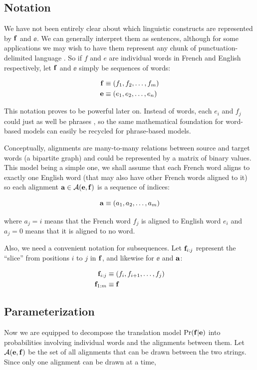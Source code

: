 \documentclass[11pt]{article}
\begin{document}
\subsection{Notation} \label{notation}
We have not been entirely clear about which linguistic constructs are represented by $\ff$ and $\ee$.
We can generally interpret them as sentences, although for some applications we may wish
to have them represent any chunk of punctuation-delimited language \cite{och:99}.
So if $f$ and $e$ are individual words in French and English respectively, let $\ff$ and $\ee$
simply be sequences of words:

\begin{align*}
    \ff &\equiv (f_1, f_2, \dotsc, f_m) \\
    \ee &\equiv (e_1, e_2, \dotsc, e_n) \\
\end{align*}

This notation proves to be powerful later on. Instead of words, each $e_i$ and $f_j$ could just as well be
phrases \cite{och:99, koehn:03}, so the same mathematical foundation for word-based models
can easily be recycled for phrase-based models.

Conceptually, alignments are many-to-many relations between source and target words (a bipartite graph) and
could be represented by a matrix of binary values. 
This model being a simple one, we shall assume that each French word aligns to exactly one English word (that may also have other French
words aligned to it) so each alignment $\aa \in \scriptA(\ee, \ff)$ is a sequence of indices:

\[
    \aa \equiv (a_1, a_2, \dotsc, a_m)
\]

where $a_j = i$ means that the French word $f_j$ is aligned to English word $e_i$ and $a_j = 0$ means that it is aligned
to no word.

Also, we need a convenient notation for subsequences.
Let $\ff_{i:j}$ represent the ``slice'' from positions $i$ to $j$ in $\ff$, and likewise for $\ee$ and $\aa$:

\begin{align*}
    \ff_{i:j} &\equiv (f_i, f_{i+1}, \dotsc, f_j) \\
    \ff_{1:m} &\equiv \ff
\end{align*}


\subsection{Parameterization}
Now we are equipped to decompose the translation model $\Pr(\ff | \ee)$ into probabilities involving
individual words and the alignments between them. 
Let $\scriptA(\ee, \ff)$ be the set of all alignments that can be drawn between the two strings.
Since only one alignment can be drawn at a time,
\end{document}

